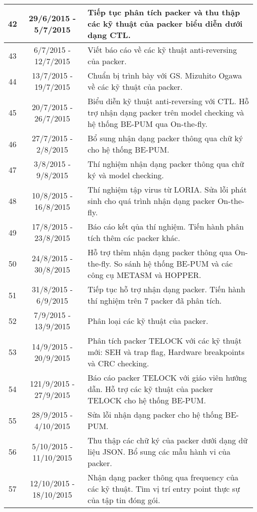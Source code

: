 \begin{center}
\begin{longtable}{|c|c|p{8cm}|}
\hline
42					& 29/6/2015 - 5/7/2015			& Tiếp tục phân tích packer và thu thập các kỹ thuật của packer biểu diễn dưới dạng CTL.\\
\hline
43					& 6/7/2015 - 12/7/2015			& Viết báo cáo về các kỹ thuật anti-reversing của packer.\\
\hline
44					& 13/7/2015 - 19/7/2015			& Chuẩn bị trình bày với GS. Mizuhito Ogawa về các kỹ thuật của packer.\\
\hline
45					& 20/7/2015 - 26/7/2015			& Biểu diễn kỹ thuật anti-reversing với CTL. Hỗ trợ nhận dạng packer trên model checking và hệ thống BE-PUM qua On-the-fly.\\
\hline
46					& 27/7/2015 - 2/8/2015			& Bổ sung nhận dạng packer thông qua chữ ký cho hệ thống BE-PUM.\\
\hline
47					& 3/8/2015 - 9/8/2015			& Thí nghiệm nhận dạng packer thông qua chữ ký và model checking.\\
\hline
48					& 10/8/2015 - 16/8/2015			& Thí nghiệm tập virus từ LORIA. Sửa lỗi phát sinh cho quá trình nhận dạng packer On-the-fly.\\
\hline
49					& 17/8/2015 - 23/8/2015			& Báo cáo kết qủa thí nghiệm. Tiến hành phân tích thêm các packer khác.\\
\hline
50					& 24/8/2015 - 30/8/2015			& Hỗ trợ thêm nhận dạng packer thông qua On-the-fly. So sánh hệ thống BE-PUM và các công cụ METASM và HOPPER.\\
\hline
51					& 31/8/2015 - 6/9/2015			& Tiếp tục hỗ trợ nhận dạng packer. Tiến hành thí nghiệm trên 7 packer đã phân tích.\\
\hline
52					& 7/9/2015 - 13/9/2015			& Phân loại các kỹ thuật của packer.\\
\hline
53					& 14/9/2015 - 20/9/2015			& Phân tích packer TELOCK với các kỹ thuật mới: SEH và trap flag, Hardware breakpoints và CRC checking.\\
\hline
54					& 121/9/2015 - 27/9/2015		& Báo cáo packer TELOCK với giáo viên hướng dẫn. Hỗ trợ các kỹ thuật của packer TELOCK cho hệ thống BE-PUM.\\
\hline
55					& 28/9/2015 - 4/10/2015			& Sửa lỗi nhận dạng packer cho hệ thống BE-PUM.\\
\hline
56					& 5/10/2015 - 11/10/2015		& Thu thập các chữ ký của packer dưới dạng dữ liệu JSON. Bổ sung các mẫu hành vi của packer.\\
\hline
57					& 12/10/2015 - 18/10/2015		& Nhận dạng packer thông qua frequency của các kỹ thuật. Tìm vị trí entry point thực sự của tập tin đóng gói.\\

\end{longtable}
\end{center}
